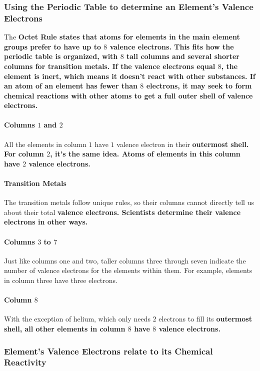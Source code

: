 \subsubsection*{Using the Periodic Table to determine an Element's Valence Electrons}

The \bf{Octet Rule} states that atoms for elements in the main element groups prefer to have up to $8$ \bf{valence electrons}. This fits how the periodic table is organized, with $8$ tall columns and several shorter columns for \bf{transition metals}. If the \bf{valence electrons} equal $8$, the element is inert, which means it doesn't react with other substances. If an atom of an element has fewer than $8$ electrons, it may seek to form chemical reactions with other atoms to get a full outer shell of valence electrons.

\paragraph{Columns $1$ and $2$} All the elements in column $1$ have $1$ valence electron in their \bf{outermost shell}. For column $2$, it's the same idea. Atoms of elements in this column have $2$ \bf{valence electrons}.

\paragraph{Transition Metals} The transition metals follow unique rules, so their columns cannot directly tell us about their total \bf{valence electrons}. Scientists determine their valence electrons in other ways.

\paragraph{Columns $3$ to $7$} Just like columns one and two, taller columns three through seven indicate the number of valence electrons for the elements within them. For example, elements in column three have three electrons.

\paragraph{Column $8$} With the exception of helium, which only needs $2$ electrons to fill its \bf{outermost shell}, all other elements in column $8$ have $8$ \bf{valence electrons}.

\subsubsection*{Element's Valence Electrons relate to its Chemical Reactivity}

